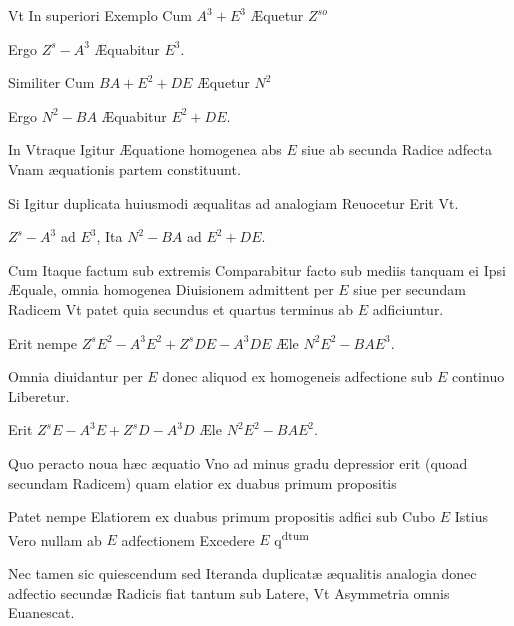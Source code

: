 \documentclass[11pt,a4paper]{article}
\begin{document}
Vt In superiori Exemplo Cum $A^3 + E^3$ Æquetur $Z^{so}$

Ergo $Z^{s} - A^3$ Æquabitur $E^3$.

Similiter Cum $BA + E^2 + DE$ Æquetur $N^2$

Ergo $N^2 - BA$ Æquabitur $E^2 + DE$.

In Vtraque Igitur Æquatione homogenea abs $E$ siue ab secunda Radice adfecta Vnam æquationis partem constituunt.

Si Igitur duplicata huiusmodi æqualitas ad analogiam Reuocetur Erit Vt.

$Z^{s} - A^3$ ad $E^3$, Ita $N^2 - BA$ ad $E^2 + DE$.

Cum Itaque factum sub extremis Comparabitur facto sub mediis tanquam ei Ipsi Æquale, omnia homogenea Diuisionem admittent per $E$ siue per secundam Radicem Vt patet quia secundus et quartus terminus ab $E$ adficiuntur.


Erit nempe $Z^sE^2 - A^3E^2 + Z^sDE - A^3DE$ Æle $N^2E^2 - BAE^3$.

Omnia diuidantur per $E$ donec aliquod ex homogeneis adfectione sub $E$ continuo Liberetur.

Erit $Z^sE - A^3E + Z^sD - A^3D$ Æle $N^2E^2 - BAE^2$.

Quo peracto noua hæc æquatio Vno ad minus gradu depressior erit (quoad secundam Radicem) quam elatior ex duabus primum propositis

Patet nempe Elatiorem ex duabus primum propositis adfici sub Cubo $E$ Istius Vero nullam ab $E$ adfectionem Excedere $E$ q\textsuperscript{dtum}

Nec tamen sic quiescendum sed Iteranda duplicatæ æqualitis analogia donec adfectio secundæ Radicis fiat tantum sub Latere, Vt Asymmetria omnis Euanescat.
\end{document}

